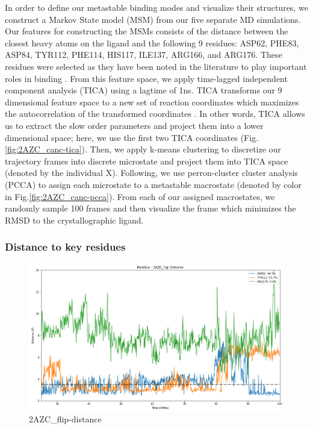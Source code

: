 \documentclass[fleqn,10pt]{wlscirep}
\begin{document}
In order to define our metastable binding modes and visualize their structures, we construct a Markov State model (MSM) \cite{} from our five separate MD simulations.
Our features for constructing the MSMs consists of the distance between the closest heavy atoms on the ligand and the following 9 residues: ASP62, PHE83, ASP84, TYR112, PHE114, HIS117, ILE137, ARG166, and ARG176.
These residues were selected as they have been noted in the literature to play important roles in binding \cite{tanaka}.
From this feature space, we apply time-lagged independent component analysis (TICA) using a lagtime of 1ns.
TICA transforms our 9 dimensional feature space to a new set of reaction coordinates which maximizes the autocorrelation of the transformed coordinates \cite{}.
In other words, TICA allows us to extract the slow order parameters and project them into a lower dimensional space; here, we use the first two TICA coordinates (Fig. \ref{fig:2AZC_canc-tica}).
Then, we apply k-means clustering to discretize our trajectory frames into discrete microstate and project them into TICA space (denoted by the individual X).
Following, we use perron-cluster cluster analysis (PCCA) \cite{} to assign each microstate to a metastable macrostate (denoted by color in Fig.\ref{fig:2AZC_canc-pcca}).
From each of our assigned macrostates, we randomly sample 100 frames and then visualize the frame which minimizes the RMSD to the crystallographic ligand.

\subsubsection{Distance to key residues}

\begin{figure}[!ht]
\centering
\includegraphics[width=\linewidth]{2AZC_flip/2AZC_flip-distance.png}
\caption{2AZC_{flip}-distance}
\label{fig:2AZC_flip-distance}
\end{figure}
\end{document}

